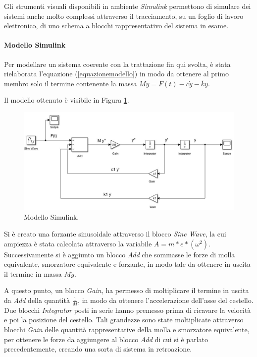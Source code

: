  Gli  strumenti visuali disponibili in ambiente \textit{Simulink} permettono di  simulare  dei sistemi  anche  molto  complessi attraverso il tracciamento, su  un  foglio  di  lavoro  elettronico, di  uno  schema  a  blocchi  rappresentativo del sistema in esame.
 
 \paragraph{Modello Simulink} Per modellare un sistema coerente con la trattazione fin qui svolta, è stata rielaborata l'equazione (\ref{equazionemodello}) in modo da ottenere al primo membro solo il termine contenente la massa $M\ddot y=F(t)-\bar c \dot y-\bar k y$.
 
 Il modello ottenuto è visibile in Figura \ref{ModelloSimulink}.
 \begin{figure}[ht]
    \centering
    \includegraphics[width=\textwidth]{Immagini/Modello simulink.JPG}
    \caption{Modello Simulink.}
    \label{ModelloSimulink}
\end{figure}

Si è creato una forzante sinusoidale attraverso il blocco \textit{Sine Wave}, la cui ampiezza è stata calcolata attraverso la variabile $A=m*e*(\omega^2)$. Successivamente si è aggiunto un blocco \textit{Add} che sommasse le forze di molla equivalente, smorzatore equivalente e forzante, in modo tale da ottenere in uscita il termine in massa $M\ddot y$. 

A questo punto, un blocco \textit{Gain}, ha permesso di moltiplicare il termine in uscita da \textit{Add} della quantità $\frac{1}{M}$, in modo da ottenere l'accelerazione dell'asse del cestello. Due blocchi \textit{Integrator} posti in serie hanno premesso prima di ricavare la velocità e poi la posizione del cestello. Tali grandezze sono state moltiplicate attraverso blocchi \textit{Gain} delle quantità rappresentative della molla e smorzatore equivalente, per ottenere le forze da aggiungere al blocco \textit{Add} di cui si è parlato precedentemente, creando una sorta di sistema in retroazione. 

